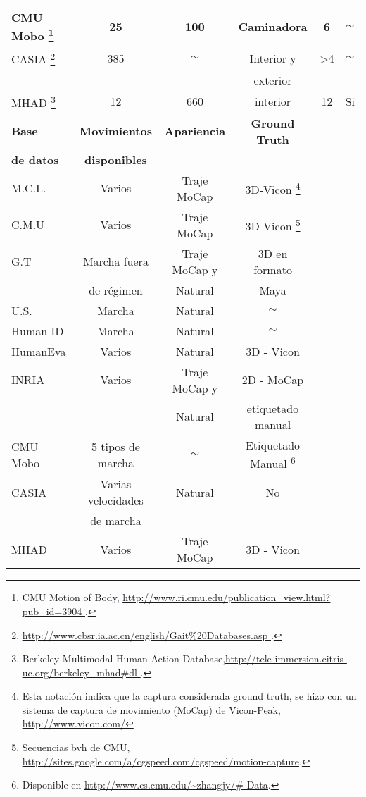\begin{table}[h!]
\begin{minipage}{\textwidth}
\begin{tabular}{||l|ccccc||}
CMU Mobo \footnote{CMU Motion of Body,  \textcolor{blue}{\underline{\url{http://www.ri.cmu.edu/publication_view.html?pub_id=3904 }}}.} &     25    & 100           & Caminadora &   6      &  $\sim$       \\ \hline
CASIA \footnote{ \textcolor{blue}{\underline{\url{http://www.cbsr.ia.ac.cn/english/Gait\%20Databases.asp
 }}}.}&     385    & $\sim$           & Interior y  &   >4      &  $\sim$       \\ 
 &         &            & exterior  &         &      \\ \hline
MHAD \footnote{Berkeley Multimodal Human Action Database,\textcolor{blue}{\underline{\url{http://tele-immersion.citris-uc.org/berkeley_mhad\#dl  }}}.} & 12         & 660            & interior  & 12        & Si      \\ 
\hline \hline


\rowcolor[HTML]{CBCEFB}
\textbf{Base}     & \textbf{Movimientos}  & \textbf{Apariencia}    & \textbf{Ground Truth} & & \\
\rowcolor[HTML]{CBCEFB}
\textbf{de datos} & \textbf{disponibles} &               &           & & \\
\hline \hline

{M.C.L. }   & Varios    &  Traje MoCap & 3D-Vicon \footnote{ Esta notación indica que la captura considerada ground truth, se hizo con un sistema  de captura de movimiento (MoCap) de Vicon-Peak, \textcolor{blue}{\underline{\url{http://www.vicon.com/}}} } & & \\ \hline
{C.M.U }    & Varios    &  Traje MoCap & 3D-Vicon \footnote{Secuencias bvh de CMU, \textcolor{blue}{\underline{\url{http://sites.google.com/a/cgspeed.com/cgspeed/motion-capture}}}.} & & \\ \hline
{G.T} &     Marcha fuera&     Traje MoCap y       & 3D  en formato & & \\ 
	 &	   de régimen  &  Natural   &   Maya & & \\ \hline
U.S. &       Marcha    &  Natural    &  $\sim$ & &       \\	\hline
Human ID &     Marcha    & Natural  & $\sim$ &  &       \\ \hline
HumanEva &     Varios    & Natural  & 3D - Vicon & &   \\ \hline
INRIA &       Varios    & Traje MoCap y            & 2D - MoCap &   &       \\
  &           & Natural            &   etiquetado manual  & &         \\ \hline
  CMU Mobo &     5 tipos de marcha    & $\sim$           & Etiquetado Manual \footnote{Disponible en  \textcolor{blue}{\underline{\url{http://www.cs.cmu.edu/~zhangjy/\# Data}}}.}&         &        \\ \hline
CASIA &  Varias velocidades       &   Natural         & No  &         &      \\ 
 & de marcha        &            &   &         &      \\ \hline
MHAD & Varios        & Traje MoCap            & 3D - Vicon    &   &       \\
\hline


\end{tabular}
\end{minipage}
\end{table}
